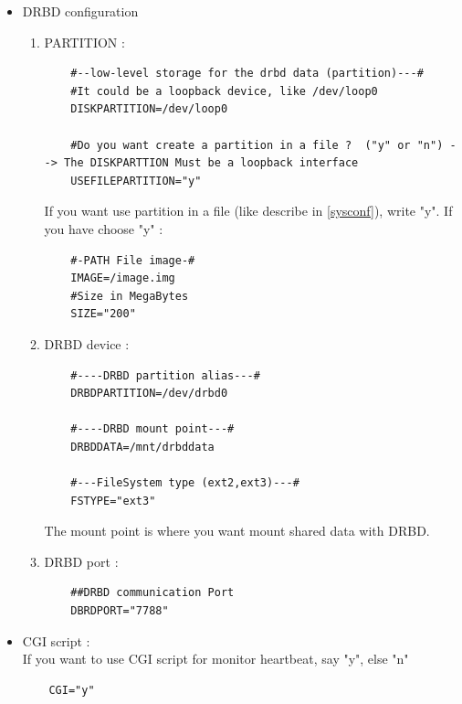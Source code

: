 \documentclass[a4paper,10pt]{report}
\begin{document}
\begin{itemize}
 \item DRBD configuration
\begin{enumerate}
 \item PARTITION :\\
  \begin{lstlisting}
    #--low-level storage for the drbd data (partition)---#
    #It could be a loopback device, like /dev/loop0
    DISKPARTITION=/dev/loop0

    #Do you want create a partition in a file ?  ("y" or "n") --> The DISKPARTTION Must be a loopback interface
    USEFILEPARTITION="y"
  \end{lstlisting}
If you want use partition in a file (like describe in \ref{sysconf}), write "y". If you have choose "y" :
  \begin{lstlisting}
    #-PATH File image-#
    IMAGE=/image.img
    #Size in MegaBytes
    SIZE="200"
  \end{lstlisting}
  
  \item DRBD device :\\
  \begin{lstlisting}
    #----DRBD partition alias---#
    DRBDPARTITION=/dev/drbd0

    #----DRBD mount point---#
    DRBDDATA=/mnt/drbddata

    #---FileSystem type (ext2,ext3)---#
    FSTYPE="ext3"
  \end{lstlisting}
The mount point is where you want mount shared data with DRBD.

  \item DRBD port :\\
  \begin{lstlisting}
    ##DRBD communication Port
    DBRDPORT="7788"
  \end{lstlisting}
  
\end{enumerate}

\item CGI script :\\
  If you want to use CGI script for monitor heartbeat, say "y", else "n"
  \begin{lstlisting}
    CGI="y"
  \end{lstlisting}

\end{itemize}
\end{document}
